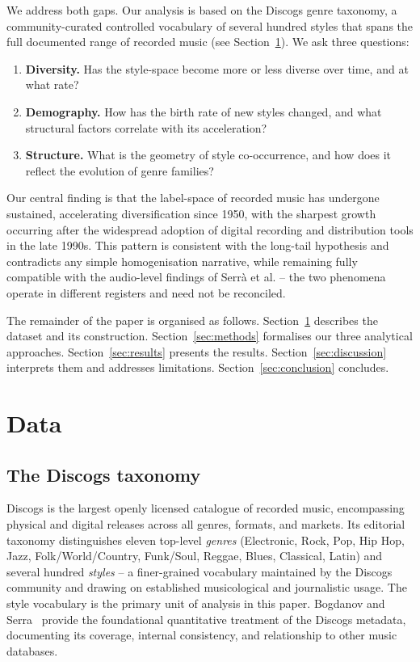 \documentclass[12pt, a4paper]{article}
\begin{document}
We address both gaps. Our analysis is based on the Discogs genre taxonomy,
a community-curated controlled vocabulary of several hundred styles
that spans the full documented range of recorded music
(see Section~\ref{sec:data}).
We ask three questions:

\begin{enumerate}[leftmargin=*, itemsep=2pt]
  \item \textbf{Diversity.} Has the style-space become more or less diverse
    over time, and at what rate?
  \item \textbf{Demography.} How has the birth rate of new styles changed,
    and what structural factors correlate with its acceleration?
  \item \textbf{Structure.} What is the geometry of style co-occurrence,
    and how does it reflect the evolution of genre families?
\end{enumerate}

Our central finding is that the label-space of recorded music has undergone
sustained, accelerating diversification since 1950, with the sharpest growth
occurring after the widespread adoption of digital recording and distribution
tools in the late 1990s. This pattern is consistent with the long-tail
hypothesis and contradicts any simple homogenisation narrative, while remaining
fully compatible with the audio-level findings of Serr\`{a} et al. -- the two
phenomena operate in different registers and need not be reconciled.

The remainder of the paper is organised as follows.
Section~\ref{sec:data} describes the dataset and its construction.
Section~\ref{sec:methods} formalises our three analytical approaches.
Section~\ref{sec:results} presents the results.
Section~\ref{sec:discussion} interprets them and addresses limitations.
Section~\ref{sec:conclusion} concludes.

\section{Data}
\label{sec:data}

\subsection{The Discogs taxonomy}

Discogs is the largest openly licensed catalogue of recorded music,
encompassing physical and digital releases across all genres, formats, and
markets. Its editorial taxonomy distinguishes eleven top-level
\emph{genres} (Electronic, Rock, Pop, Hip Hop, Jazz, Folk/World/Country,
Funk/Soul, Reggae, Blues, Classical, Latin) and several hundred
\emph{styles} -- a finer-grained vocabulary maintained by the Discogs
community and drawing on established musicological and journalistic usage.
The style vocabulary is the primary unit of analysis in this paper.
Bogdanov and Serra~\citep{bogdanov2017quantifying} provide the
foundational quantitative treatment of the Discogs metadata, documenting
its coverage, internal consistency, and relationship to other music databases.
\end{document}
